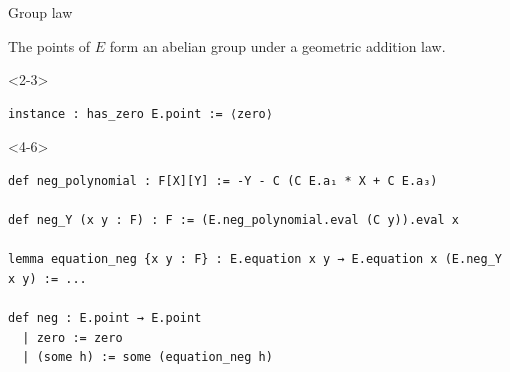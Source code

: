 \documentclass[10pt]{beamer}
\begin{document}
\begin{frame}[fragile, t]{Group law}

\begin{theorem}
The points of $ E $ form an abelian group under a geometric addition law.
\end{theorem}


\begin{onlyenv}<2-3>
\begin{lstlisting}[backgroundcolor=\color{lime}, basicstyle=\scriptsize, frame=single]
instance : has_zero E.point := ⟨zero⟩
\end{lstlisting}
\end{onlyenv}




\begin{onlyenv}<4-6>
\begin{lstlisting}[backgroundcolor=\color{lime}, basicstyle=\scriptsize, frame=single]
def neg_polynomial : F[X][Y] := -Y - C (C E.a₁ * X + C E.a₃)

def neg_Y (x y : F) : F := (E.neg_polynomial.eval (C y)).eval x

lemma equation_neg {x y : F} : E.equation x y → E.equation x (E.neg_Y x y) := ...

def neg : E.point → E.point
  | zero := zero
  | (some h) := some (equation_neg h)


\end{lstlisting}
\end{onlyenv}
\end{frame}
\end{document}
